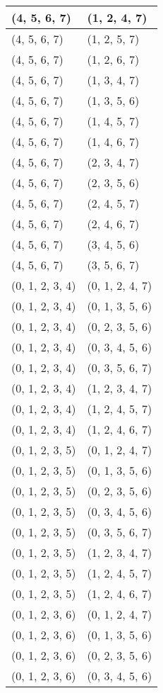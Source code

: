 \begin{footnotesize}
\begin{longtable}[c]{|l|l|}
(4, 5, 6, 7)
&(1, 2, 4, 7)
\\ \hline
(4, 5, 6, 7)
&(1, 2, 5, 7)
\\ \hline
(4, 5, 6, 7)
&(1, 2, 6, 7)
\\ \hline
(4, 5, 6, 7)
&(1, 3, 4, 7)
\\ \hline
(4, 5, 6, 7)
&(1, 3, 5, 6)
\\ \hline
(4, 5, 6, 7)
&(1, 4, 5, 7)
\\ \hline
(4, 5, 6, 7)
&(1, 4, 6, 7)
\\ \hline
(4, 5, 6, 7)
&(2, 3, 4, 7)
\\ \hline
(4, 5, 6, 7)
&(2, 3, 5, 6)
\\ \hline
(4, 5, 6, 7)
&(2, 4, 5, 7)
\\ \hline
(4, 5, 6, 7)
&(2, 4, 6, 7)
\\ \hline
(4, 5, 6, 7)
&(3, 4, 5, 6)
\\ \hline
(4, 5, 6, 7)
&(3, 5, 6, 7)
\\ \hline
(0, 1, 2, 3, 4)
&(0, 1, 2, 4, 7)
\\ \hline
(0, 1, 2, 3, 4)
&(0, 1, 3, 5, 6)
\\ \hline
(0, 1, 2, 3, 4)
&(0, 2, 3, 5, 6)
\\ \hline
(0, 1, 2, 3, 4)
&(0, 3, 4, 5, 6)
\\ \hline
(0, 1, 2, 3, 4)
&(0, 3, 5, 6, 7)
\\ \hline
(0, 1, 2, 3, 4)
&(1, 2, 3, 4, 7)
\\ \hline
(0, 1, 2, 3, 4)
&(1, 2, 4, 5, 7)
\\ \hline
(0, 1, 2, 3, 4)
&(1, 2, 4, 6, 7)
\\ \hline
(0, 1, 2, 3, 5)
&(0, 1, 2, 4, 7)
\\ \hline
(0, 1, 2, 3, 5)
&(0, 1, 3, 5, 6)
\\ \hline
(0, 1, 2, 3, 5)
&(0, 2, 3, 5, 6)
\\ \hline
(0, 1, 2, 3, 5)
&(0, 3, 4, 5, 6)
\\ \hline
(0, 1, 2, 3, 5)
&(0, 3, 5, 6, 7)
\\ \hline
(0, 1, 2, 3, 5)
&(1, 2, 3, 4, 7)
\\ \hline
(0, 1, 2, 3, 5)
&(1, 2, 4, 5, 7)
\\ \hline
(0, 1, 2, 3, 5)
&(1, 2, 4, 6, 7)
\\ \hline
(0, 1, 2, 3, 6)
&(0, 1, 2, 4, 7)
\\ \hline
(0, 1, 2, 3, 6)
&(0, 1, 3, 5, 6)
\\ \hline
(0, 1, 2, 3, 6)
&(0, 2, 3, 5, 6)
\\ \hline
(0, 1, 2, 3, 6)
&(0, 3, 4, 5, 6)

\end{longtable}
\end{footnotesize}
